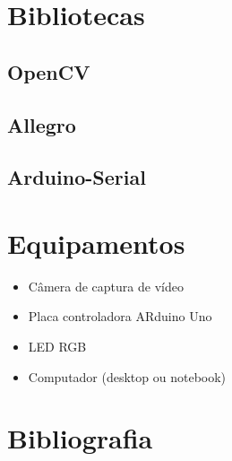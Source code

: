 \documentclass[12pt]{article}
\begin{document}
\section{Bibliotecas}
\subsection{OpenCV}
\subsection{Allegro}
\subsection{Arduino-Serial}

\section{Equipamentos}
\begin{itemize}
\item C\^amera de captura de v\'ideo
\item Placa controladora ARduino Uno
\item LED RGB
\item Computador (desktop ou notebook)
\end{itemize}

\nocite{*}

\section{Bibliografia}


\end{document}
